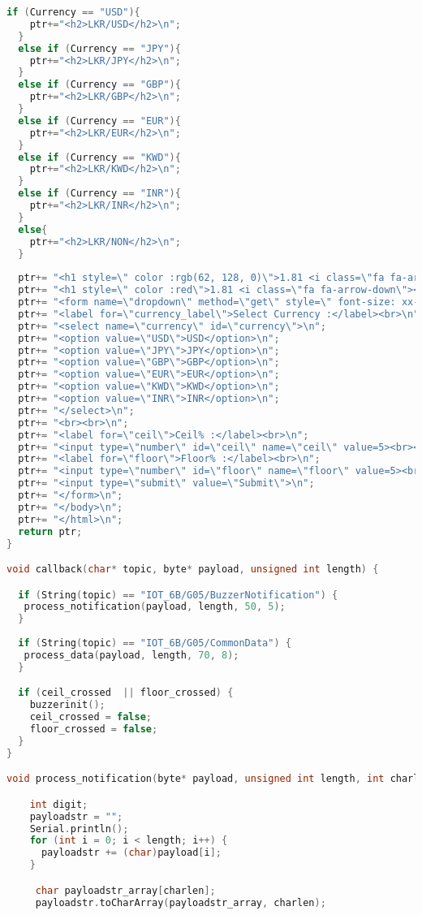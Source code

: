 \begin{lstlisting}[language=C++]
  if (Currency == "USD"){
    ptr+="<h2>LKR/USD</h2>\n";
  }
  else if (Currency == "JPY"){
    ptr+="<h2>LKR/JPY</h2>\n";
  }
  else if (Currency == "GBP"){
    ptr+="<h2>LKR/GBP</h2>\n";
  }
  else if (Currency == "EUR"){
    ptr+="<h2>LKR/EUR</h2>\n";
  }
  else if (Currency == "KWD"){
    ptr+="<h2>LKR/KWD</h2>\n";
  }
  else if (Currency == "INR"){
    ptr+="<h2>LKR/INR</h2>\n";
  }
  else{
    ptr+="<h2>LKR/NON</h2>\n";
  }
  
  ptr+= "<h1 style=\" color :rgb(62, 128, 0)\">1.81 <i class=\"fa fa-arrow-up\"></i></h1>\n";
  ptr+= "<h1 style=\" color :red\">1.81 <i class=\"fa fa-arrow-down\"></i></h1>\n";
  ptr+= "<form name=\"dropdown\" method=\"get\" style=\" font-size: xx-large;\" >\n";
  ptr+= "<label for=\"currency_label\">Select Currency :</label><br>\n";
  ptr+= "<select name=\"currency\" id=\"currency\">\n";
  ptr+= "<option value=\"USD\">USD</option>\n";
  ptr+= "<option value=\"JPY\">JPY</option>\n";
  ptr+= "<option value=\"GBP\">GBP</option>\n";
  ptr+= "<option value=\"EUR\">EUR</option>\n";
  ptr+= "<option value=\"KWD\">KWD</option>\n";
  ptr+= "<option value=\"INR\">INR</option>\n";
  ptr+= "</select>\n";
  ptr+= "<br><br>\n";
  ptr+= "<label for=\"ceil\">Ceil% :</label><br>\n";
  ptr+= "<input type=\"number\" id=\"ceil\" name=\"ceil\" value=5><br><br>\n";
  ptr+= "<label for=\"floor\">Floor% :</label><br>\n";
  ptr+= "<input type=\"number\" id=\"floor\" name=\"floor\" value=5><br><br>\n";
  ptr+= "<input type=\"submit\" value=\"Submit\">\n";
  ptr+= "</form>\n";
  ptr+= "</body>\n";
  ptr+= "</html>\n";
  return ptr;
}

void callback(char* topic, byte* payload, unsigned int length) {

  if (String(topic) == "IOT_6B/G05/BuzzerNotification") {
   process_notification(payload, length, 50, 5);
  }
  
  if (String(topic) == "IOT_6B/G05/CommonData") {
   process_data(payload, length, 70, 8);
  }

  if (ceil_crossed  || floor_crossed) {
    buzzerinit();  
    ceil_crossed = false;
    floor_crossed = false;
  }
}

void process_notification(byte* payload, unsigned int length, int charlen, int numitem) {

    int digit;
    payloadstr = "";
    Serial.println();
    for (int i = 0; i < length; i++) {
      payloadstr += (char)payload[i];
    }

     char payloadstr_array[charlen];
     payloadstr.toCharArray(payloadstr_array, charlen);


\end{lstlisting}

